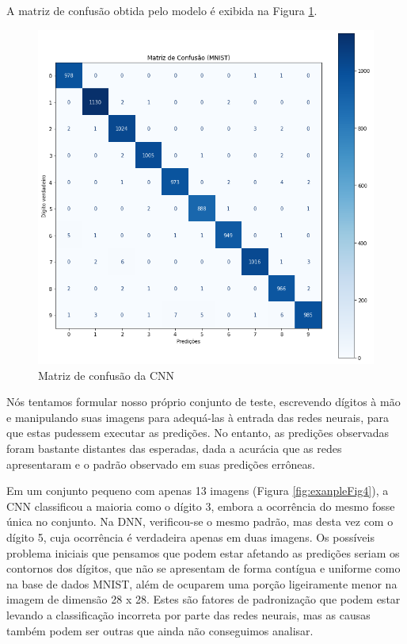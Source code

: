 \documentclass[a4paper, 12pt]{article}
\begin{document}
\noindent A matriz de confusão obtida pelo modelo é exibida na Figura \ref{fig:exanpleFig3}.

\begin{figure}[H]
    \centering
    \includegraphics[width=.9\textwidth]{Images/confusion_matrix.png}
    \caption{Matriz de confusão da CNN}
    \label{fig:exanpleFig3}
\end{figure}

Nós tentamos formular nosso próprio conjunto de teste, escrevendo dígitos à mão e manipulando suas imagens para adequá-las à entrada das redes neurais, para que estas pudessem executar as predições. No entanto, as predições observadas foram bastante distantes das esperadas, dada a acurácia que as redes apresentaram e o padrão observado em suas predições errôneas.

Em um conjunto pequeno com apenas 13 imagens (Figura \ref{fig:exanpleFig4}), a CNN classificou a maioria como o dígito 3, embora a ocorrência do mesmo fosse única no conjunto. Na DNN, verificou-se o mesmo padrão, mas desta vez com o dígito 5, cuja ocorrência é verdadeira apenas em duas imagens. Os possíveis problema iniciais que pensamos que podem estar afetando as predições seriam os contornos dos dígitos, que não se apresentam de forma contígua e uniforme como na base de dados MNIST, além de ocuparem uma porção ligeiramente menor na imagem de dimensão 28 x 28. Estes são fatores de padronização que podem estar levando a classificação incorreta por parte das redes neurais, mas as causas também podem ser outras que ainda não conseguimos analisar.
\end{document}
